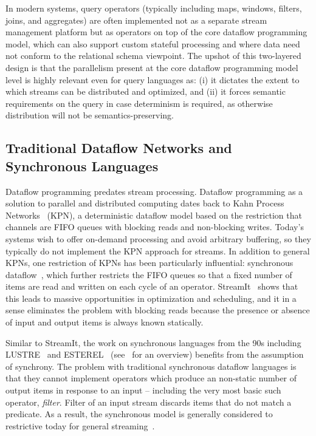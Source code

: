 In modern systems, query operators (typically including maps, windows, filters, joins, and aggregates)
are often implemented not as a separate stream management platform but as
operators on top of the core dataflow programming model, which can also support custom stateful processing and where data need not conform to the relational schema viewpoint.
The upshot of this two-layered design is that the parallelism present at the core dataflow programming model level is highly relevant even for query languages as: (i) it dictates the extent to which streams can be distributed and optimized, and (ii) it forces semantic requirements on the query in case determinism is required, as otherwise distribution will not be semantics-preserving.

\subsection{Traditional Dataflow Networks and Synchronous Languages}

Dataflow programming predates stream processing.
Dataflow programming as a solution to parallel and distributed computing
dates back to Kahn Process Networks~\cite{gilles1974semantics} (KPN), a deterministic dataflow model based on the restriction that channels are FIFO queues with blocking reads and non-blocking writes. Today's systems wish to offer on-demand processing and avoid arbitrary buffering, so they typically do not implement the KPN approach for streams.
In addition to general KPNs, one restriction of KPNs has been particularly influential: synchronous dataflow~\cite{lee1987synchronous}, which further restricts the FIFO queues so that a fixed number of items are read and written on each cycle of an operator. StreamIt~\cite{thies2002streamit} shows that this leads to massive opportunities in optimization and scheduling, and it in a sense eliminates the problem with blocking reads because the presence or absence of input and output items is always known statically.

Similar to StreamIt,
the work on synchronous languages from the 90s including LUSTRE~\cite{halbwachs1991synchronous} and ESTEREL~\cite{berry1992esterel} (see~\cite{BCEHlGdS2003SL} for an overview) benefits from the assumption of
synchrony.
The problem with traditional synchronous dataflow languages is that they cannot implement operators which produce an non-static number of output items in response to an input -- including the very most basic such operator, \emph{filter}. Filter of an input stream discards items that do not match a predicate. As a result, the synchronous model is generally considered to restrictive today for general streaming~\cite{schneider2013safe}.


